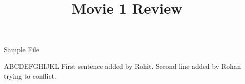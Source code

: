 \documentclass{article}
\begin{document}
\title{Movie 1 Review}


\centerline{\sc \large Sample File}
\vspace{.5pc}
\centerline{\sc }
\vspace{2pc}
ABCDEFGHIJKL
First sentence added by Rohit.
Second line added by Rohan trying to conflict.
\end{document}
